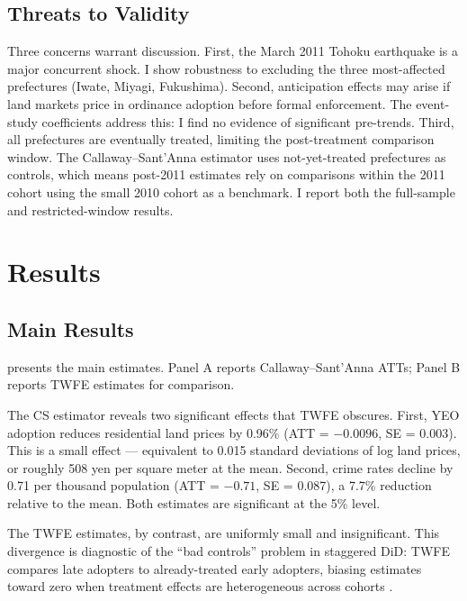 \documentclass[12pt]{article}
\begin{document}
\subsection{Threats to Validity}

Three concerns warrant discussion. First, the March 2011 Tohoku earthquake is a major concurrent shock. I show robustness to excluding the three most-affected prefectures (Iwate, Miyagi, Fukushima). Second, anticipation effects may arise if land markets price in ordinance adoption before formal enforcement. The event-study coefficients address this: I find no evidence of significant pre-trends. Third, all prefectures are eventually treated, limiting the post-treatment comparison window. The Callaway--Sant'Anna estimator uses not-yet-treated prefectures as controls, which means post-2011 estimates rely on comparisons within the 2011 cohort using the small 2010 cohort as a benchmark. I report both the full-sample and restricted-window results.

\section{Results}

\subsection{Main Results}



 presents the main estimates. Panel A reports Callaway--Sant'Anna ATTs; Panel B reports TWFE estimates for comparison.

The CS estimator reveals two significant effects that TWFE obscures. First, YEO adoption reduces residential land prices by 0.96\% (ATT = $-0.0096$, SE = 0.003). This is a small effect --- equivalent to 0.015 standard deviations of log land prices, or roughly 508 yen per square meter at the mean. Second, crime rates decline by 0.71 per thousand population (ATT = $-0.71$, SE = 0.087), a 7.7\% reduction relative to the mean. Both estimates are significant at the 5\% level.

The TWFE estimates, by contrast, are uniformly small and insignificant. This divergence is diagnostic of the ``bad controls'' problem in staggered DiD: TWFE compares late adopters to already-treated early adopters, biasing estimates toward zero when treatment effects are heterogeneous across cohorts \citep{goodmanbacon2021difference}.
\end{document}
